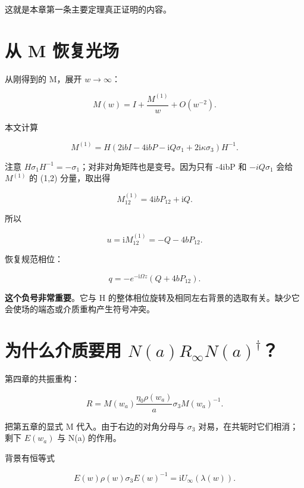 这就是本章第一条主要定理真正证明的内容。\par

\section{从 M 恢复光场}
\par

从刚得到的 M，展开 $w\to{}\infty{}$：\par

\[
M(w)=I+\dfrac{M^{(1)}}{w}+O(w^{-2}).
\]

本文计算\par

\[
M^{(1)}
=H\left(2\mathrm{i}bI-4\mathrm{i}bP
-\mathrm{i}Q\sigma_1+2\mathrm{i}\kappa\sigma_3\right)H^{-1}.
\]

注意 $H\sigma{}_{1}H^{-1}=-\sigma{}_{1}$；对非对角矩阵也是变号。因为只有 -4ibP 和 $-iQ\sigma{}_{1}$ 会给 $M^{(1)}$ 的 (1,2) 分量，取出得\par

\[
M^{(1)}_{12}=4\mathrm{i}bP_{12}+\mathrm{i}Q.
\]

所以\par

\[
u=\mathrm{i}M^{(1)}_{12}=-Q-4bP_{12}.
\]

恢复规范相位：\par

\[
\boxed{q=-e^{-\mathrm{i}\Omega z}(Q+4bP_{12}).}
\]

\textbf{这个负号非常重要}。它与 H 的整体相位旋转及相同左右背景的选取有关。缺少它会使场的端态或介质重构产生符号冲突。\par

\section{为什么介质要用 \texorpdfstring{$N(a)R_\infty N(a)^\dagger$}{N(a) R(infinity) N(a)*}？}

第四章的共振重构：\par

\[
R=M(w_a)\dfrac{\eta_0\rho(w_a)}{a}
\sigma_3 M(w_a)^{-1}.
\]

把第五章的显式 M 代入。由于右边的对角分母与 $\sigma{}_{3}$ 对易，在共轭时它们相消；剩下 $E(w_{a})$ 与 N(a) 的作用。\par

背景有恒等式\par

\[
E(w)\rho(w)\sigma_3E(w)^{-1}
=\mathrm{i}U_\infty(\lambda(w)).
\]

